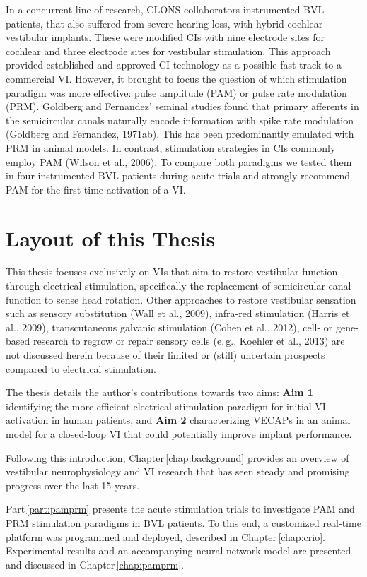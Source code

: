 In a concurrent line of research, CLONS collaborators instrumented BVL patients, that also suffered from severe hearing loss, with hybrid cochlear-vestibular implants. These were modified CIs with nine electrode sites for cochlear and three electrode sites for vestibular stimulation. This approach provided established and approved CI technology as a possible fast-track to a commercial VI. However, it brought to focus the question of which stimulation paradigm was more effective: pulse amplitude (PAM) or pulse rate modulation (PRM). Goldberg and Fernandez' seminal studies found that primary afferents in the semicircular canals naturally encode information with spike rate modulation (Goldberg and Fernandez, 1971ab). This has been predominantly emulated with PRM in animal models. In contrast, stimulation strategies in CIs commonly employ PAM (Wilson et al., 2006). To compare both paradigms we tested them in four instrumented BVL patients during acute trials and strongly recommend PAM for the first time activation of a VI.

\section*{Layout of this Thesis}
This thesis focuses exclusively on VIs that aim to restore vestibular function through electrical stimulation, specifically the replacement of semicircular canal function to sense head rotation. Other approaches to restore vestibular sensation such as sensory substitution (Wall et al., 2009), infra-red stimulation (Harris et al., 2009), transcutaneous galvanic stimulation (Cohen et al., 2012), cell- or gene-based research to regrow or repair sensory cells (e.\,g., Koehler et al., 2013) are not discussed herein because of their limited or (still) uncertain prospects compared to electrical stimulation.  

The thesis details the author's contributions towards two aims: \textbf{Aim 1} identifying the more efficient electrical stimulation paradigm for initial VI activation in human patients, and \textbf{Aim 2} characterizing VECAPs in an animal model for a closed-loop VI that could potentially improve implant performance. 

Following this introduction, Chapter\,\ref{chap:background} provides an overview of vestibular neurophysiology and VI research that has seen steady and promising progress over the last 15 years. 

Part\,\ref{part:pamprm} presents the acute stimulation trials to investigate PAM and PRM stimulation paradigms in BVL patients. To this end, a customized real-time platform was programmed and deployed, described in Chapter\,\ref{chap:crio}. Experimental results and an accompanying neural network model are presented and discussed in Chapter\,\ref{chap:pamprm}. 

